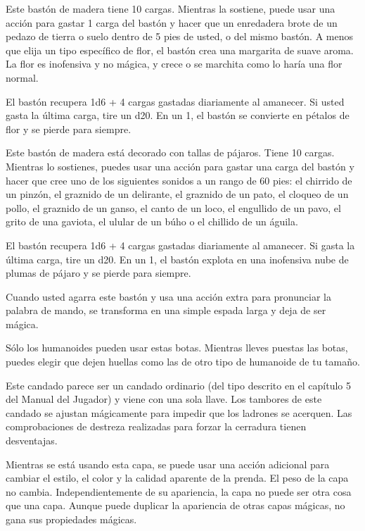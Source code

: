 \documentclass[a4paper,twocolumn,openany,10pt]{dndbook}
\begin{document}
Este bastón de madera tiene 10 cargas. Mientras la sostiene, puede usar una acción para gastar 1 carga del bastón y hacer que un
enredadera brote de un pedazo de tierra o suelo dentro de 5 pies de usted, o del mismo bastón. A menos que elija un tipo
específico de flor, el bastón crea una margarita de suave aroma. La flor es inofensiva y no mágica, y crece o se marchita como
lo haría una flor normal.

El bastón recupera 1d6 + 4 cargas gastadas diariamente al amanecer. Si usted gasta la última carga, tire un d20. En un 1, el
bastón se convierte en pétalos de flor y se pierde para siempre. 

Este bastón de madera está decorado con tallas de pájaros. Tiene 10 cargas. Mientras lo sostienes, puedes usar una acción para
gastar una carga del bastón y hacer que cree uno de los siguientes sonidos a un rango de 60 pies: el chirrido de un pinzón, el
graznido de un delirante, el graznido de un pato, el cloqueo de un pollo, el graznido de un ganso, el canto de un loco, el
engullido de un pavo, el grito de una gaviota, el ulular de un búho o el chillido de un águila.

El bastón recupera 1d6 + 4 cargas gastadas diariamente al amanecer. Si gasta la última carga, tire un d20. En un 1, el bastón
explota en una inofensiva nube de plumas de pájaro y se pierde para siempre. 

Cuando usted agarra este bastón y usa una acción extra para pronunciar la palabra de mando, se transforma en una simple espada
larga y deja de ser mágica.

Sólo los humanoides pueden usar estas botas. Mientras lleves puestas las botas, puedes elegir que dejen huellas como las de otro
tipo de humanoide de tu tamaño. 

Este candado parece ser un candado ordinario (del tipo descrito en el capítulo 5 del Manual del Jugador) y viene con una sola
llave. Los tambores de este candado se ajustan mágicamente para impedir que los ladrones se acerquen. Las comprobaciones de
destreza realizadas para forzar la cerradura tienen desventajas. 

Mientras se está usando esta capa, se puede usar una acción adicional para cambiar el estilo, el color y la calidad aparente de
la prenda. El peso de la capa no cambia. Independientemente de su apariencia, la capa no puede ser otra cosa que una capa.
Aunque puede duplicar la apariencia de otras capas mágicas, no gana sus propiedades mágicas. 
\end{document}
